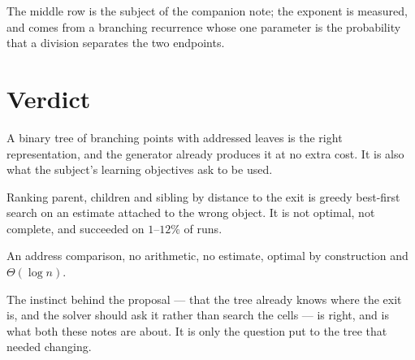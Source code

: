 \documentclass[11pt,a4paper]{article}
\begin{document}
The middle row is the subject of the companion note; the exponent is measured,
and comes from a branching recurrence whose one parameter is the probability
that a division separates the two endpoints.

\section{Verdict}

\begin{description}[leftmargin=*,style=nextline,itemsep=5pt]
  \item[The structure: keep it.] A binary tree of branching points with
    addressed leaves is the right representation, and the generator already
    produces it at no extra cost. It is also what the subject's learning
    objectives ask to be used.
  \item[The navigation rule: replace it.] Ranking parent, children and sibling
    by distance to the exit is greedy best-first search on an estimate attached
    to the wrong object. It is not optimal, not complete, and succeeded on
    $1$--$12\%$ of runs.
  \item[What replaces it is simpler, not harder.] An address comparison, no
    arithmetic, no estimate, optimal by construction and $\Theta(\log n)$.
\end{description}

The instinct behind the proposal --- that the tree already knows where the exit
is, and the solver should ask it rather than search the cells --- is right, and
is what both these notes are about. It is only the question put to the tree that
needed changing.
\end{document}
